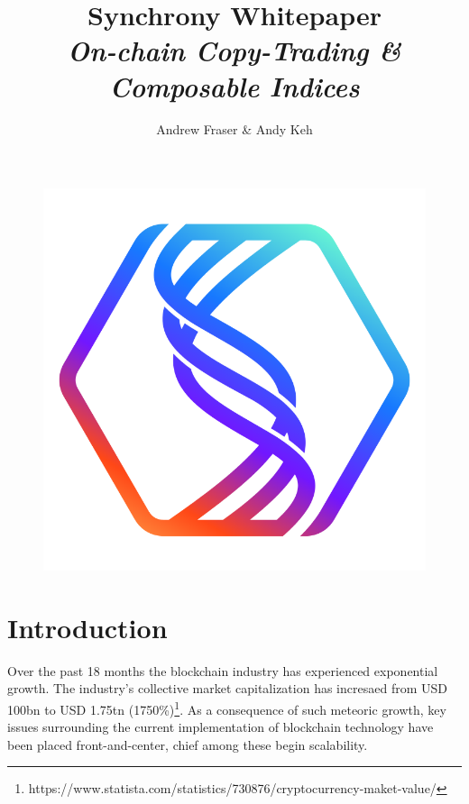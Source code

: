 \documentclass[10pt]{article}
\title{%
	\textbf{Synchrony Whitepaper}\\
	\emph{On-chain Copy-Trading \& Composable Indices}}
\author{Andrew Fraser \& Andy Keh}
\begin{document}
	\maketitle
	\begin{center}
		\begin{figure}[h]
			\includegraphics[scale=0.75]{SYNCHRONY-LOGO.png}
			\centering
		\end{figure}
	\end{center}

	\newpage
	\tableofcontents

	\newpage
		\section{Introduction}
			Over the past 18 months the blockchain industry has experienced exponential growth. The
			industry's collective market capitalization has incresaed from USD 100bn to USD 1.75tn
			(1750\%)\footnote[1]{https://www.statista.com/statistics/730876/cryptocurrency-maket-value/}.
			As a consequence of such meteoric growth, key issues surrounding the current
			implementation of blockchain technology have been placed front-and-center, chief among
			these begin scalability. 
\end{document}
